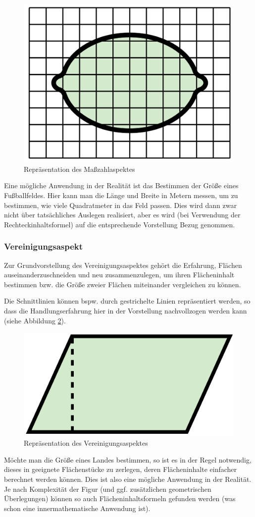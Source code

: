 \documentclass[
]{scrbook}
\theoremstyle{definition}
\theoremstyle{definition}
\theoremstyle{definition}
\theoremstyle{definition}
\theoremstyle{remark}
\begin{document}
\begin{figure}

{\centering \includegraphics[width=0.25\linewidth]{pictures/5-Masszahl} 

}

\caption{Repräsentation des Maßzahlaspektes}\label{fig:FlaecheMasszahl}
\end{figure}

Eine mögliche Anwendung in der Realität ist das Bestimmen der Größe eines Fußballfeldes. Hier kann man die Länge und Breite in Metern messen, um zu bestimmen, wie viele Quadratmeter in das Feld passen. Dies wird dann zwar nicht über tatsächliches Auslegen realisiert, aber es wird (bei Verwendung der Rechteckinhaltsformel) auf die entsprechende Vorstellung Bezug genommen.

\hypertarget{vereinigungsaspekt}{%
\subsubsection{Vereinigungsaspekt}\label{vereinigungsaspekt}}

Zur Grundvorstellung des Vereinigungsaspektes gehört die Erfahrung, Flächen auseinanderzuschneiden und neu zusammenzulegen, um ihren Flächeninhalt bestimmen bzw. die Größe zweier Flächen miteinander vergleichen zu können.

Die Schnittlinien können bspw. durch gestrichelte Linien repräsentiert werden, so dass die Handlungserfahrung hier in der Vorstellung nachvollzogen werden kann (siehe Abbildung \ref{fig:FlaecheVereinigung}).

\begin{figure}

{\centering \includegraphics[width=0.25\linewidth]{pictures/5-abb-Vereinigung} 

}

\caption{Repräsentation des Vereinigungsaspektes}\label{fig:FlaecheVereinigung}
\end{figure}

Möchte man die Größe eines Landes bestimmen, so ist es in der Regel notwendig, dieses in geeignete Flächenstücke zu zerlegen, deren Flächeninhalte einfacher berechnet werden können. Dies ist also eine mögliche Anwendung in der Realität. Je nach Komplexität der Figur (und ggf. zusätzlichen geometrischen Überlegungen) können so auch Flächeninhaltsformeln gefunden werden (was schon eine innermathematische Anwendung ist).
\end{document}
